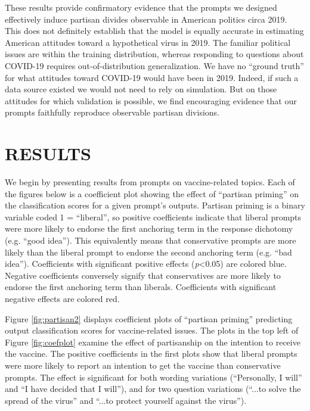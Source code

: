 \documentclass{article}
\begin{document}
These results provide confirmatory evidence that the prompts we designed
effectively induce partisan divides observable in American politics
circa 2019. This does not definitely establish that the model is equally
accurate in estimating American attitudes toward a hypothetical virus in
2019. The familiar political issues are within the training
distribution, whereas responding to questions about COVID-19 requires
out-of-distribution generalization. We have no ``ground truth'' for what
attitudes toward COVID-19 would have been in 2019. Indeed, if such a
data source existed we would not need to rely on simulation. But on
those attitudes for which validation is possible, we find encouraging
evidence that our prompts faithfully reproduce observable partisan
divisions.

\section*{RESULTS}

We begin by presenting results from prompts on vaccine-related topics.
Each of the figures below is a coefficient plot showing the effect of
``partisan priming'' on the classification scores for a given prompt's
outputs. Partisan priming is a binary variable coded 1 = ``liberal'', so
positive coefficients indicate that liberal prompts were more likely to
endorse the first anchoring term in the response dichotomy (e.g. ``good
idea''). This equivalently means that conservative prompts are more
likely than the liberal prompt to endorse the second anchoring term
(e.g. ``bad idea''). Coefficients with significant positive effects
(\emph{p}\textless0.05) are colored blue. Negative coefficients
conversely signify that conservatives are more likely to endorse the
first anchoring term than liberals. Coefficients with significant
negative effects are colored red.

Figure \ref{fig:partisan2} displays coefficient plots of ``partisan priming'' predicting
output classification scores for vaccine-related issues. The plots in
the top left of Figure \ref{fig:coefplot} examine the effect of partisanship on the
intention to receive the vaccine. The positive coefficients in the first
plots show that liberal prompts were more likely to report an intention
to get the vaccine than conservative prompts. The effect is significant
for both wording variations (``Personally, I will'' and ``I have decided
that I will''), and for two question variations (``...to solve the
spread of the virus'' and ``...to protect yourself against the virus'').
\end{document}
